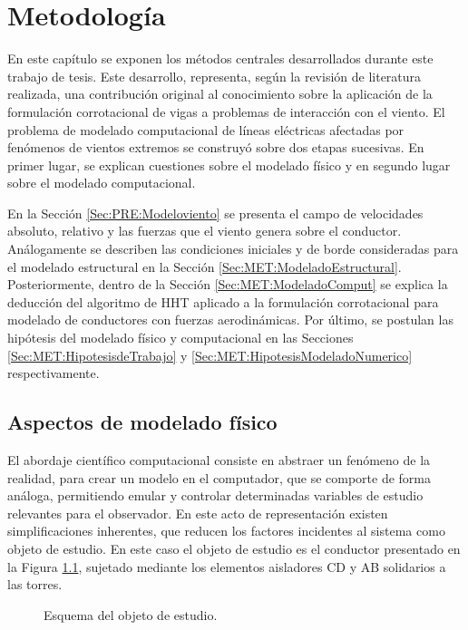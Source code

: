 \chapter{Metodología}\label{Cap:Metodologia}
\linenumbers

En este capítulo se exponen los métodos centrales desarrollados durante este trabajo de tesis. Este desarrollo, representa, según la revisión de literatura realizada, una contribución original al conocimiento sobre la aplicación de la formulación corrotacional de vigas a problemas de interacción con el viento. El problema de modelado computacional de líneas eléctricas afectadas por fenómenos de vientos extremos se construyó sobre dos etapas sucesivas. En primer lugar, se explican cuestiones sobre el modelado físico y en segundo lugar sobre el modelado computacional.

En la Sección \ref{Sec:PRE:Modeloviento} se presenta el campo de velocidades absoluto, relativo y las fuerzas que el viento genera sobre el conductor. Análogamente se describen las condiciones iniciales y de borde consideradas para el modelado estructural en la Sección \ref{Sec:MET:ModeladoEstructural}.  Posteriormente, dentro de la Sección \ref{Sec:MET:ModeladoComput} se explica la deducción del algoritmo de HHT aplicado a la formulación corrotacional para modelado de conductores con fuerzas aerodinámicas. Por último, se postulan las hipótesis del modelado físico y computacional en las Secciones \ref{Sec:MET:HipotesisdeTrabajo}  y \ref{Sec:MET:HipotesisModeladoNumerico} respectivamente. 

\section{Aspectos de modelado físico}

El abordaje científico computacional consiste en abstraer un fenómeno de la realidad, para crear un modelo en el computador, que se comporte de forma análoga, permitiendo emular y controlar determinadas variables de estudio relevantes para el observador. En este acto de representación existen simplificaciones inherentes, que reducen los factores incidentes al sistema como objeto de estudio. En este caso el objeto de estudio es el conductor presentado en la Figura \ref{fig:MET:EsquemaCondiciones}, sujetado mediante los elementos aisladores CD y AB solidarios a las torres.

\begin{figure}[htbp]
	\centering
	\def\svgwidth{80mm}
	
	\caption{Esquema del objeto de estudio.}
	\label{fig:MET:EsquemaCondiciones}
\end{figure}


